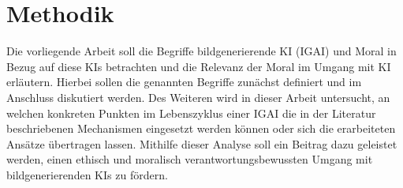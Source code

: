 \chapter{Methodik}
Die vorliegende Arbeit soll die Begriffe bildgenerierende KI (IGAI) und Moral in Bezug auf diese KIs betrachten und 
die Relevanz der Moral im Umgang mit KI erläutern. Hierbei sollen die genannten Begriffe zunächst definiert und im 
Anschluss diskutiert werden. Des Weiteren wird in dieser Arbeit untersucht, an welchen konkreten Punkten im Lebenszyklus 
einer IGAI die in der Literatur beschriebenen Mechanismen eingesetzt werden können oder sich die erarbeiteten Ansätze übertragen 
lassen. Mithilfe dieser Analyse soll ein Beitrag dazu geleistet werden, einen ethisch und moralisch verantwortungsbewussten 
Umgang mit bildgenerierenden KIs zu fördern.